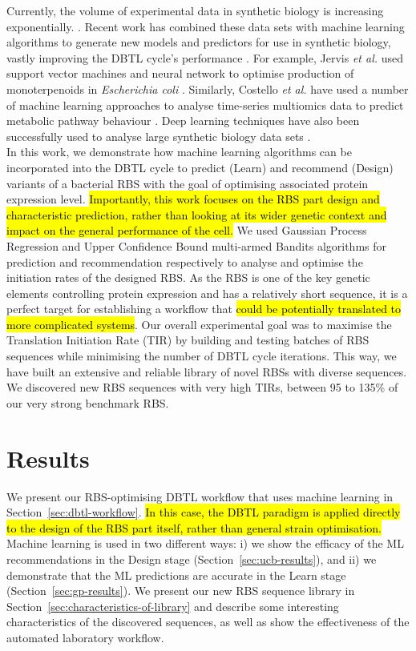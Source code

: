 \documentclass{article}
\begin{document}
Currently, the volume of experimental data in synthetic biology is increasing exponentially. \cite{Freemont2019}.
Recent work has combined these data sets with machine learning algorithms to generate new models and predictors for use in synthetic biology, vastly improving the DBTL cycle's performance \cite{Camacho2018,Radivojevic2020,LAWSON2021}.
For example, Jervis \emph{et al.} used support vector machines and neural network to optimise production of monoterpenoids in \emph{Escherichia coli} \cite{Jervis2019}.
Similarly, Costello \emph{et al.} have used a number of machine learning approaches to analyse time-series multiomics data to predict metabolic pathway behaviour \cite{Costello2018}.
Deep learning techniques have also been successfully used to analyse large synthetic biology data sets \cite{Alipanahi2015,Angermueller2016,Hollerer2020}.\\

In this work, we demonstrate how machine learning algorithms can be incorporated into the DBTL cycle to predict (Learn) and recommend (Design) variants of a bacterial RBS with the goal of optimising associated protein expression level.
\hl{Importantly, this work focuses on the RBS part design and characteristic prediction, rather than looking at its wider genetic context and impact on the general performance of the cell.}
We used Gaussian Process Regression \cite{Rasmussen2004} and Upper Confidence Bound multi-armed Bandits algorithms \cite{desautels2014parallelizing} for prediction and recommendation respectively to analyse and optimise the initiation rates of the designed RBS.
As the RBS is one of the key genetic elements controlling protein expression and has a relatively short sequence, it is a perfect target for establishing a workflow that \hl{could be potentially translated to more complicated systems}.
Our overall experimental goal was to maximise the Translation Initiation Rate (TIR) by building and testing batches of RBS sequences while minimising the number of DBTL cycle iterations.
This way, we have built an extensive and reliable library of novel RBSs with diverse sequences.
We discovered new RBS sequences with very high TIRs, between 95 to 135\% of our very strong benchmark RBS.



\section{Results}

We present our RBS-optimising DBTL workflow that uses machine learning in Section~\ref{sec:dbtl-workflow}.
\hl{In this case, the {DBTL} paradigm is applied directly to the design of the RBS part itself, rather than general strain optimisation.}
Machine learning is used in two different ways: i) we show the efficacy of the ML recommendations
in the Design stage (Section~\ref{sec:ucb-results}),
and ii) we demonstrate that the ML predictions are accurate in the Learn stage (Section~\ref{sec:gp-results}).
We present our new RBS sequence library in Section~\ref{sec:characteristics-of-library} and describe some interesting
characteristics of the discovered sequences,
as well as show the effectiveness of the automated laboratory workflow.
\end{document}
